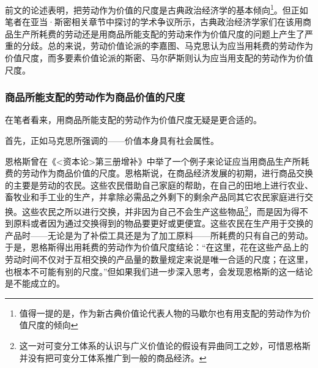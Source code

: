 前文的论述表明，把劳动作为价值的尺度是古典政治经济学的基本倾向\footnote{值得一提的是，作为新古典价值论代表人物的马歇尔也有用支配的劳动作为价值尺度的倾向\cite{perskyMarshallsNeoClassicalLaborValues1999}}。但正如笔者在亚当·斯密相关章节中探讨的学术争议所示，古典政治经济学家们在该用商品生产所耗费的劳动还是用商品所能支配的劳动来作为价值尺度的问题上产生了严重的分歧。总的来说，劳动价值论派的李嘉图、马克思认为应当用耗费的劳动作为价值尺度，而多要素价值论派的斯密、马尔萨斯则认为应当用支配的劳动作为价值尺度。

\subsubsection{商品所能支配的劳动作为商品价值的尺度}

在笔者看来，用商品所能支配的劳动作为价值尺度无疑是更合适的。

首先，正如马克思所强调的——价值本身具有社会属性\cite[61]{ZhongGongZhongYangMaKeSiEnGeSiLieNingSiDaLinZhuZuoBianYiJuMaKeSiEnGeSiWenJiDi5Juan2009}。

恩格斯曾在《<资本论>第三册增补》中举了一个例子来论证应当用商品生产所耗费的劳动作为商品价值的尺度\cite[1015-1018]{ZhongGongZhongYangMaKeSiEnGeSiLieNingSiDaLinZhuZuoBianYiJuMaKeSiEnGeSiWenJiDi7Juan2009}。恩格斯说，在商品经济发展的初期，进行商品交换的主要是劳动的农民。这些农民借助自己家庭的帮助，在自己的田地上进行农业、畜牧业和手工业的生产，并拿除必需品之外剩下的剩余产品同其它农民家庭进行交换。这些农民之所以进行交换，并非因为自己不会生产这些物品\footnote{这一对可变分工体系的认识与广义价值论的假设有异曲同工之妙，可惜恩格斯并没有把可变分工体系推广到一般的商品经济。}，而是因为得不到原料或者因为通过交换得到的物品要更好或更便宜。这些农民在生产用于交换的产品时——无论是为了补偿工具还是为了加工原料——所耗费的只有自己的劳动。于是，恩格斯得出用耗费的劳动作为价值尺度结论：“在这里，花在这些产品上的劳动时间不仅对于互相交换的产品量的数量规定来说是唯一合适的尺度；在这里，也根本不可能有别的尺度。”\cite[1016]{ZhongGongZhongYangMaKeSiEnGeSiLieNingSiDaLinZhuZuoBianYiJuMaKeSiEnGeSiWenJiDi7Juan2009}但如果我们进一步深入思考，会发现恩格斯的这一结论是不能成立的。

